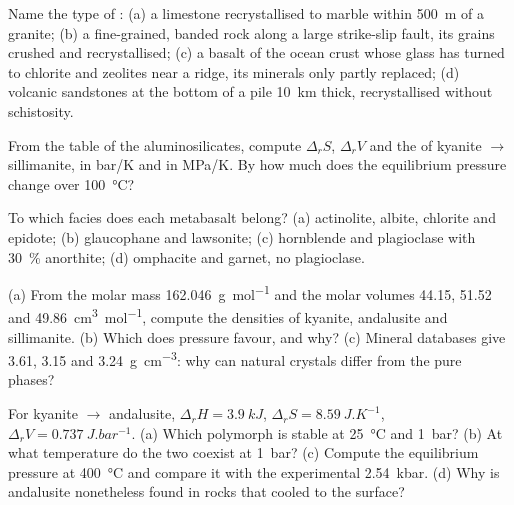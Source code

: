\begin{exercise}[$\star$]\label{exo:b2:metamorphic-facies:1}
Name the type of : (a) a limestone recrystallised to marble within
\qty{500}{m} of a granite; (b) a fine-grained, banded rock along a large strike-slip
fault, its grains crushed and recrystallised; (c) a basalt of the ocean crust whose
glass has turned to chlorite and zeolites near a ridge, its minerals only partly
replaced; (d) volcanic sandstones at the bottom of a pile \qty{10}{km} thick,
recrystallised without schistosity.
\end{exercise}

\begin{exercise}[$\star$]\label{exo:b2:metamorphic-facies:2}
From the table of the aluminosilicates, compute $\Delta_r S$, $\Delta_r V$ and the
 of kyanite $\to$ sillimanite, in \unit{bar/K} and in \unit{MPa/K}. By how
much does the equilibrium pressure change over \qty{100}{\celsius}?
\end{exercise}

\begin{exercise}[$\star$]\label{exo:b2:metamorphic-facies:3}
To which facies does each metabasalt belong? (a) actinolite, albite, chlorite and
epidote; (b) glaucophane and lawsonite; (c) hornblende and plagioclase with
\qty{30}{\percent} anorthite; (d) omphacite and garnet, no plagioclase.
\end{exercise}

\begin{exercise}[$\star$]\label{exo:b2:metamorphic-facies:4}
(a) From the molar mass \qty{162.046}{g.mol^{-1}} and the molar volumes 44.15, 51.52 and
\qty{49.86}{cm^3.mol^{-1}}, compute the densities of kyanite, andalusite and sillimanite.
(b) Which does pressure favour, and why? (c) Mineral databases give 3.61, 3.15 and
\qty{3.24}{g.cm^{-3}}: why can natural crystals differ from the pure phases?
\end{exercise}

\begin{exercise}[$\star\star$]\label{exo:b2:metamorphic-facies:5}
For kyanite $\to$ andalusite, $\Delta_r H = \qty{3.9}{kJ}$, $\Delta_r S =
\qty{8.59}{J.K^{-1}}$, $\Delta_r V = \qty{0.737}{J.bar^{-1}}$. (a) Which polymorph is
stable at \qty{25}{\celsius} and \qty{1}{bar}? (b) At what temperature do the two
coexist at \qty{1}{bar}? (c) Compute the equilibrium pressure at \qty{400}{\celsius} and
compare it with the experimental \qty{2.54}{kbar}. (d) Why is andalusite nonetheless
found in rocks that cooled to the surface?
\end{exercise}


